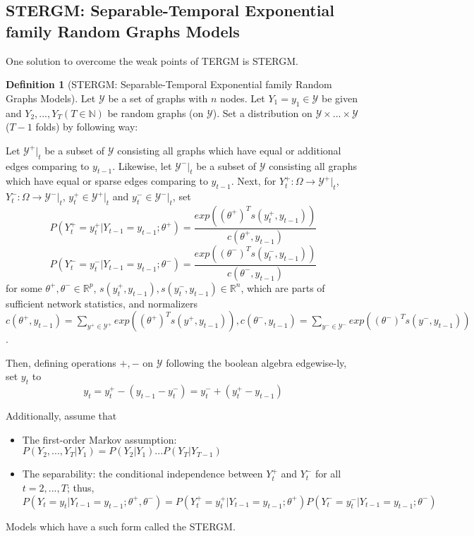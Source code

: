 \documentclass[aspectratio=169,ignorenonframetext,9pt]{beamer}
\theoremstyle{plain}
\theoremstyle{definition}
\newtheorem{defn}{Definition}[section]
\begin{document}
\subsection{STERGM: Separable-Temporal Exponential family Random Graphs Models}
One solution to overcome the weak points of TERGM is STERGM. %


\begin{defn}[STERGM: Separable-Temporal Exponential family Random Graphs Models]
    Let $\mathcal{Y}$ be a set of graphs with $n$ nodes. 
    Let $Y_1=y_1 \in \mathcal{Y}$ be given and $Y_2,...,Y_T (T\in\mathbb{N})$ be random graphs (on $\mathcal{Y}$).
    Set a distribution on $\mathcal{Y}\times ... \times \mathcal{Y}$ ($T-1$ folds) by following way:

    Let $\mathcal{Y}^+|_t$ be a subset of $\mathcal{Y}$ consisting all graphs which have equal or additional edges comparing to $y_{t-1}$.
    Likewise, let $\mathcal{Y}^-|_t$ be a subset of $\mathcal{Y}$ consisting all graphs which have equal or sparse edges comparing to $y_{t-1}$.
    Next, for $Y_t^+: \Omega \to\mathcal{Y}^+|_t$, $Y_t^-: \Omega \to\mathcal{Y}^-|_t$, $y_t^+ \in \mathcal{Y}^+|_t$ and $y_t^- \in \mathcal{Y}^-|_t$, set
    \[P(Y_t^+=y_t^+|Y_{t-1}=y_{t-1};\theta^+) = \frac{exp((\theta^+)^{T}s(y_t^+, y_{t-1}))}{c(\theta^+, y_{t-1})}\]
    \[P(Y_t^-=y_t^-|Y_{t-1}=y_{t-1};\theta^-) = \frac{exp((\theta^-)^{T}s(y_t^-, y_{t-1}))}{c(\theta^-, y_{t-1})}\]
    for some $\theta^+,\theta^-\in\mathbb{R}^p$, $s(y_t^+, y_{t-1}), s(y_t^-, y_{t-1})\in\mathbb{R}^n$, which are parts of sufficient network statistics,
    and normalizers $c(\theta^+, y_{t-1})=\sum_{y^+\in\mathcal{Y}^+}exp((\theta^+)^{T}s(y^+, y_{t-1})), c(\theta^-, y_{t-1})=\sum_{y^-\in\mathcal{Y}^-}exp((\theta^-)^{T}s(y^-, y_{t-1}))$.
    
    Then, defining operations $+,-$ on $\mathcal{Y}$ following the boolean algebra edgewise-ly, set $y_t$ to
    \[y_t=y_t^+ - (y_{t-1} - y_t^-) = y_t^- + (y_t^+ - y_{t-1})\]
    
    Additionally, assume that
    \begin{itemize}
        \item The first-order Markov assumption: $P(Y_2,...,Y_T|Y_1)=P(Y_2|Y_1)...P(Y_T|Y_{T-1})$
        \item The separability: the conditional independence between $Y_t^+$ and $Y_t^-$ for all $t=2,...,T$;
            thus, \(P(Y_t=y_t|Y_{t-1}=y_{t-1};\theta^+,\theta^-)=P(Y_t^+=y_t^+|Y_{t-1}=y_{t-1};\theta^+)P(Y_t^-=y_t^-|Y_{t-1}=y_{t-1};\theta^-)\)
    \end{itemize}
    Models which have a such form called the STERGM.
\end{defn}
\end{document}

